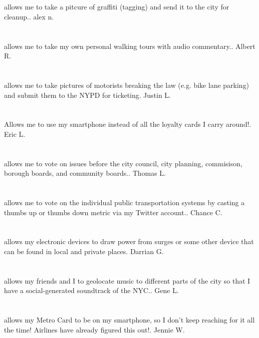 \section{}allows me to take a pitcure of graffiti (tagging) and send it to the city for cleanup.. alex n.
\section{}allows me to take my own personal walking tours with audio commentary.. Albert R.
\section{}allows me to take pictures of motorists breaking the law (e.g. bike lane parking) and submit them to the NYPD for ticketing. Justin L.
\section{}Allows me to use my smartphone instead of all the loyalty cards I carry around!. Eric L.
\section{}allows me to vote on issues before the city council,  city planning,  commisison,  borough boards,  and community boards.. Thomas L.
\section{}allows me to vote on the individual public transportation systems by casting a thumbs up or thumbs down metric via my Twitter account.. Chance C.
\section{}allows my electronic devices to draw power from surges or some other device that can be found in local and private places. Darrian G.
\section{}allows my friends and I to geolocate music to different parts of the city so that I have a social-generated soundtrack of the NYC.. Gene L.
\section{}allows my Metro Card to be on my smartphone,  so I don't keep reaching for it all the time!  Airlines have already figured this out!. Jennie W.
